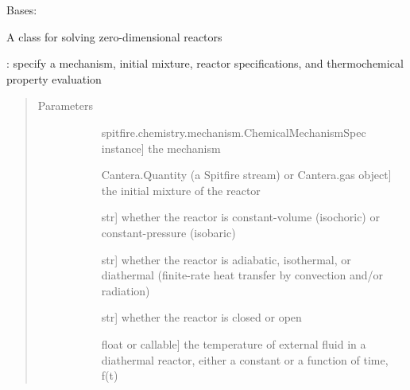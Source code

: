\documentclass[letterpaper,10pt,english]{sphinxmanual}
\begin{document}
\begin{fulllineitems}
\label{\detokenize{spitfire.chemistry.reactors:spitfire.chemistry.reactors.HomogeneousReactor}}
Bases: 

A class for solving zero-dimensional reactors

: specify a mechanism, initial mixture, reactor specifications, and thermochemical property evaluation
\begin{quote}\begin{description}
\item[{Parameters}] \leavevmode\begin{description}
\item[{}] \leavevmode{[}spitfire.chemistry.mechanism.ChemicalMechanismSpec instance{]}
the mechanism

\item[{}] \leavevmode{[}Cantera.Quantity (a Spitfire stream) or Cantera.gas object{]}
the initial mixture of the reactor

\item[{}] \leavevmode{[}str{]}
whether the reactor is constant-volume (isochoric) or constant-pressure (isobaric)

\item[{}] \leavevmode{[}str{]}
whether the reactor is adiabatic, isothermal, or diathermal (finite-rate heat transfer by convection and/or radiation)

\item[{}] \leavevmode{[}str{]}
whether the reactor is closed or open

\item[{}] \leavevmode{[}float or callable{]}
the temperature of external fluid in a diathermal reactor, either a constant or a function of time, f(t)


\end{description}
\end{description}
\end{quote}
\end{fulllineitems}
\end{document}
